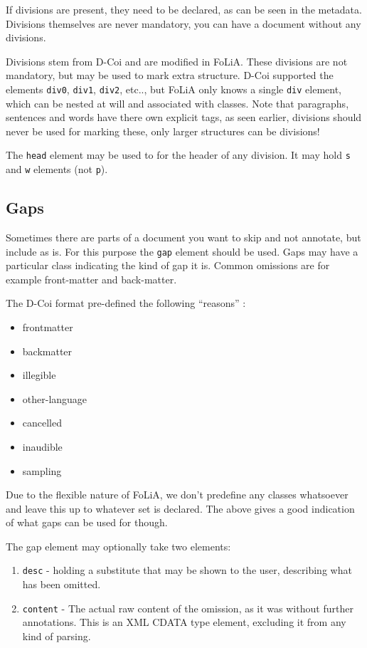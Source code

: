 \documentclass[a4paper,12pt]{report}
\begin{document}
If divisions are present, they need to be declared, as can be seen in the metadata. Divisions themselves are never mandatory, you can have a document without any divisions.

Divisions stem from D-Coi and are modified in FoLiA. These divisions are not mandatory, but may be used to mark extra structure. D-Coi supported the elements \texttt{div0}, \texttt{div1}, \texttt{div2}, etc.., but FoLiA only knows a single \texttt{div} element, which can be nested at will and associated with classes. Note that paragraphs, sentences and words have there own explicit tags, as seen earlier, divisions should never be used for marking these, only larger structures can be divisions!

The \texttt{head} element may be used to for the header of any division. It may hold \texttt{s} and \texttt{w} elements (not \texttt{p}).

\subsection{Gaps}

Sometimes there are parts of a document you want to skip and not annotate, but include as is. For this purpose the \texttt{gap} element should be used. Gaps may have a particular class indicating the kind of gap it is. Common omissions are for example front-matter and back-matter.

The D-Coi format pre-defined the following ``reasons'' \cite{DCOI}:

\begin{itemize}
\item frontmatter
\item backmatter
\item illegible
\item other-language
\item cancelled
\item inaudible
\item sampling
\end{itemize}

Due to the flexible nature of FoLiA, we don't predefine any classes whatsoever and leave this up to whatever set is declared. The above gives a good indication of what gaps can be used for though. 

The gap element may optionally take two elements:

\begin{enumerate}
\item \texttt{desc} - holding a substitute that may be shown to the user, describing what has been omitted.
\item \texttt{content} - The actual raw content of the omission, as it was without further annotations. This is an XML CDATA type element, excluding it from any kind of parsing.
\end{enumerate}
\end{document}
